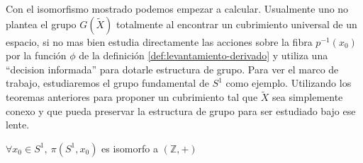 Con el isomorfismo mostrado podemos empezar a calcular. Usualmente uno
no plantea el grupo \(G (\tilde X)\) totalmente al encontrar un
cubrimiento universal de un espacio, si no mas bien estudia directamente
las acciones sobre la fibra \(p^{-1} (x_0)\) por la función
\(\phi\) de la definición \ref{def:levantamiento-derivado} y utiliza una
``decision informada'' para dotarle estructura de grupo. Para ver el
marco de trabajo, estudiaremos el grupo fundamental de \(S^1\) como
ejemplo. Utilizando los teoremas anteriores para proponer un
cubrimiento tal que \(\tilde X\) sea simplemente conexo y que pueda
preservar la estructura de grupo para ser estudiado bajo ese lente.
\begin{teorema} \label{thm:grupo-S1}
  \(\forall x_0 \in S^1,\ \pi (S^1,x_0)\) es isomorfo a \((\mathbb Z, +)\)
\end{teorema}
